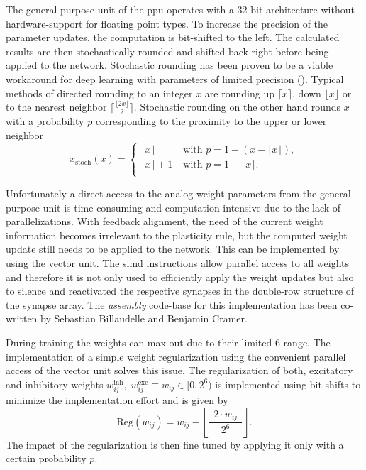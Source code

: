 The general-purpose unit of the \gls{ppu} operates with a 32-bit architecture without hardware-support for floating point types. To increase the precision of the parameter updates, the computation is bit-shifted to the left. The calculated results are then stochastically rounded and shifted back right before being applied to the network. Stochastic rounding has been proven to be a viable workaround for deep learning with parameters of limited precision (\citealp{limitedprecisionpaper}). Typical methods of directed rounding to an integer $x$ are rounding up $\lceil x\rceil$, down $\lfloor x\rfloor$ or to the nearest neighbor $\lceil\frac{\lfloor2x\rfloor}{2}\rceil$. Stochastic rounding on the other hand rounds $x$ with a probability $p$ corresponding to the proximity to the upper or lower neighbor
\begin{equation*}
x_\text{stoch}(x) = 
\begin{cases}
\lfloor x \rfloor \quad \quad &\text{with } p = 1 - (x - \lfloor x \rfloor), \\
\lfloor x \rfloor + 1 &\text{with } p = 1 - \lfloor x \rfloor. \\
\end{cases}
\end{equation*}

Unfortunately a direct access to the analog weight parameters from the general-purpose unit is time-consuming and computation intensive due to the lack of parallelizations. With feedback alignment, the need of the current weight information becomes irrelevant to the plasticity rule, but the computed weight update still needs to be applied to the network. This can be implemented by using the vector unit. The \gls{simd} instructions allow parallel access to all weights and therefore it is not only used to efficiently apply the weight updates but also to silence and reactivated the respective synapses in the double-row structure of the synapse array. The \emph{assembly} code-base for this implementation has been co-written by Sebastian Billaudelle and Benjamin Cramer.

During training the weights can max out due to their limited \SI{6}{\bit} range. The implementation of a simple weight regularization using the convenient parallel access of the vector unit solves this issue. The regularization of both, excitatory and inhibitory weights $w_{ij}^\text{inh},\; w_{ij}^\text{exc}\equiv w_{ij} \in [0,2^6)$ is implemented using bit shifts to minimize the implementation effort and is given by
\begin{equation*}
\text{Reg}(w_{ij}) = w_{ij} - \left\lfloor \frac{\lfloor 2 \cdot w_{ij}  \rfloor}{2^{6}} \right\rfloor.					
\end{equation*}
The impact of the regularization is then fine tuned by applying it only with a certain probability $p$.

